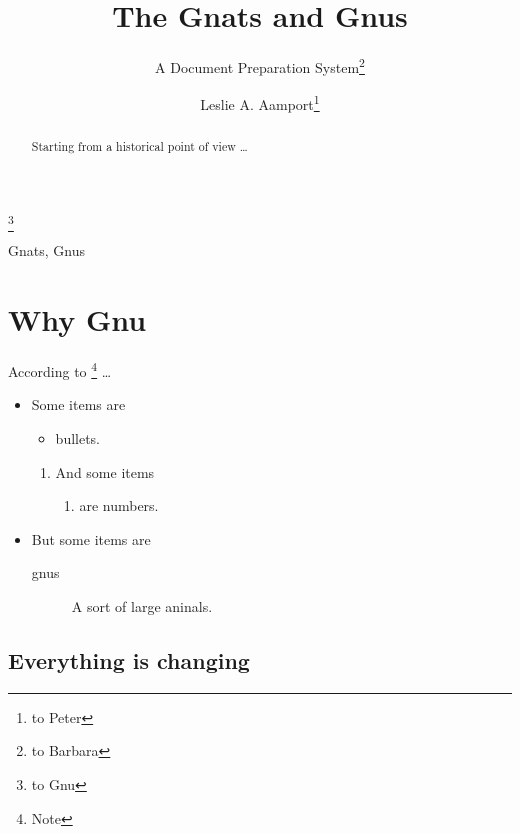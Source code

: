 \documentclass[%
]{journal}
\begin{document}
 \author{Leslie A. Aamport\thanks{to Peter}}
 \title{The Gnats and Gnus}\thanks{to Gnu}
 \subtitle{A Document Preparation System\thanks{to Barbara}}

\maketitle

 \begin{abstract}
   Starting from a historical point of view \dots
 \end{abstract}
 
 \begin{keywords}
   Gnats, Gnus
 \end{keywords}
 

\tableofcontents

\section{Why Gnu}

According to \cite{book-full}\footnote{Note} \dots

\begin{itemize}
\item Some items are 
  \begin{itemize}
  \item bullets.
  \end{itemize}
  \begin{enumerate}
  \item And some items 
    \begin{enumerate}
    \item are numbers.
    \end{enumerate}
  \end{enumerate}
\item But some items are
  \begin{description}
  \item[gnus] A sort of large aninals.
  \end{description}
\end{itemize}


\subsection{Everything is changing}
\end{document}
